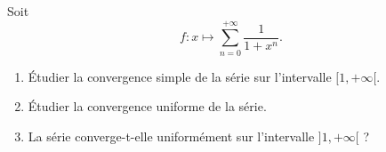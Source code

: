 \begin{enonce}
\begin{exercise}[ID={RMS135 E1462},subtitle={IMT MP 2024},tags={},difficulty={}]

Soit
\begin{equation*}
f : x \mapsto \sum_{n=0}^{+\infty} \frac{1}{1 + x^n}.
\end{equation*}

\begin{enumerate}
  \item Étudier la convergence simple de la série sur l’intervalle $[1, +\infty[$.
  \item Étudier la convergence uniforme de la série.
  \item La série converge-t-elle uniformément sur l’intervalle $]1, +\infty[$ ?
\end{enumerate}

\end{exercise}
\begin{solution}
\end{solution}
\end{enonce}
